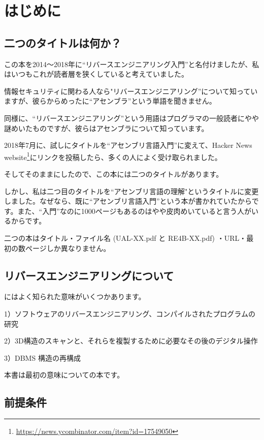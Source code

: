 \section*{はじめに}

\subsection*{二つのタイトルは何か？}
\label{TwoTitles}

この本を2014〜2018年に``リバースエンジニアリング入門''と名付けましたが、私はいつもこれが読者層を狭くしていると考えていました。

情報セキュリティに関わる人なら"リバースエンジニアリング''について知っていますが、彼らからめったに``アセンブラ''という単語を聞きません。

同様に、``リバースエンジニアリング''という用語はプログラマの一般読者にやや謎めいたものですが、彼らはアセンブラについて知っています。

2018年7月に、試しにタイトルを``アセンブリ言語入門''に変えて、Hacker News website\footnote{\url{https://news.ycombinator.com/item?id=17549050}}にリンクを投稿したら、多くの人によく受け取られました。

そしてそのままにしたので、この本には二つのタイトルがあります。

しかし、私は二つ目のタイトルを``アセンブリ言語の理解"というタイトルに変更しました。なぜなら、既に``アセンブリ言語入門''という本が書かれていたからです。また、``入門''なのに1000ページもあるのはやや皮肉めいていると言う人がいるからです。

二つの本はタイトル・ファイル名 (UAL-XX.pdf と RE4B-XX.pdf) ・URL・最初の数ページしか異なりません。

\subsection*{リバースエンジニアリングについて}

にはよく知られた意味がいくつかあります。

1）ソフトウェアのリバースエンジニアリング、コンパイルされたプログラムの研究

2）3D構造のスキャンと、それらを複製するために必要なその後のデジタル操作

3）\ac{DBMS} 構造の再構成

本書は最初の意味についての本です。

\subsection*{前提条件}

